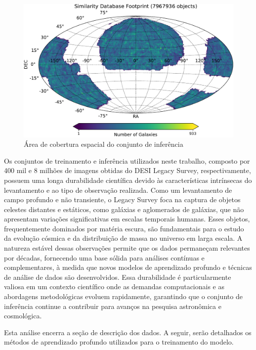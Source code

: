 \begin{figure}[!ht]
  \centering
  \caption{Área de cobertura espacial do conjunto de inferência}
  \label{fig:conjuntos_inferencia}
  \includegraphics[width=\linewidth]{figures/similarity_footprint.pdf}
\end{figure}


Os conjuntos de treinamento e inferência utilizados neste trabalho, composto por 400 mil e 8 milhões de imagens obtidas do DESI Legacy Survey, respectivamente, possuem uma longa durabilidade científica devido às características intrínsecas do levantamento e ao tipo de observação realizada. Como um levantamento de campo profundo e não transiente, o Legacy Survey foca na captura de objetos celestes distantes e estáticos, como galáxias e aglomerados de galáxias, que não apresentam variações significativas em escalas temporais humanas. Esses objetos, frequentemente dominados por matéria escura, são fundamentais para o estudo da evolução cósmica e da distribuição de massa no universo em larga escala. A natureza estável dessas observações permite que os dados permaneçam relevantes por décadas, fornecendo uma base sólida para análises contínuas e complementares, à medida que novos modelos de aprendizado profundo e técnicas de análise de dados são desenvolvidos. Essa durabilidade é particularmente valiosa em um contexto científico onde as demandas computacionais e as abordagens metodológicas evoluem rapidamente, garantindo que o conjunto de inferência continue a contribuir para avanços na pesquisa astronômica e cosmológica.

Esta análise encerra a seção de descrição dos dados. A seguir, serão detalhados os métodos de aprendizado profundo utilizados para o treinamento do modelo.







